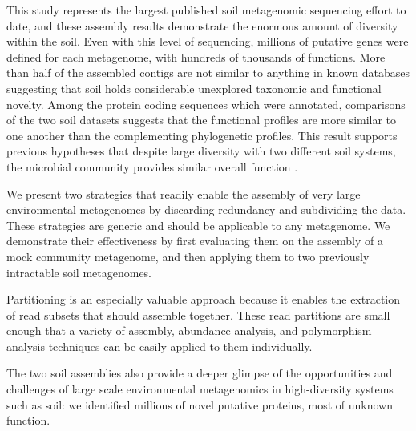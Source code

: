 \documentclass{nature}%
\begin{document}
This study represents the largest published soil metagenomic sequencing effort
to date, and these assembly results demonstrate the enormous amount of
diversity within the soil.  Even with this level of sequencing,
millions of putative genes were defined for each metagenome, with
hundreds of thousands of functions.
More than half of the assembled contigs are not similar to anything in
known databases suggesting that soil holds considerable unexplored
taxonomic and functional novelty.
Among the
protein coding sequences which were annotated, comparisons of the two
soil datasets suggests that the functional profiles are more similar
to one another than the complementing phylogenetic profiles.  This
result supports previous hypotheses that despite large diversity with
two different soil systems, the microbial community provides similar
overall function \cite{Girvan:2005jv,McGradySteed:1997uj,Muller:2002cd,Konstantinidis:2004hr}.



We present two strategies that readily enable the assembly of very
large environmental metagenomes by discarding redundancy and
subdividing the data.  These strategies are generic and should
be applicable to any metagenome.  We demonstrate their effectiveness by
first evaluating them on the assembly of a mock community metagenome,
and then applying them to two previously intractable soil metagenomes.

Partitioning is an especially valuable approach because it enables the
extraction of read subsets that should assemble together.  These read
partitions are small enough that a variety of assembly, abundance
analysis, and polymorphism analysis techniques can be easily applied
to them individually.

The two soil assemblies also provide a deeper glimpse of the
opportunities and challenges of large scale environmental metagenomics
in high-diversity systems such as soil: we identified millions of
novel putative proteins, most of unknown function.
\end{document}
